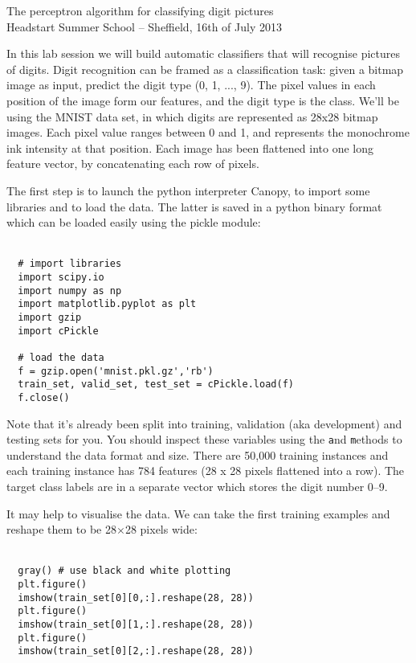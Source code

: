 \documentclass{article}
\newcommand{\mintinline}[1]{\colorbox{bg}{\lstinline[basicstyle=\ttfamily]{#1}}}
\begin{document}
\begin{center}
\textcolor{MyDarkBlue}{
{\LARGE The perceptron algorithm for classifying digit pictures\\}
\vspace*{.5cm}
{\large Headstart Summer School -- Sheffield, 16th of July 2013}
}
\end{center}
\vspace*{1cm}


In this lab session we will build automatic classifiers that will recognise pictures of digits. Digit recognition can be framed as a classification task: given a bitmap image as input, predict the digit type (0, 1, ..., 9). The pixel values in each position of the image form our features, and the digit type is the class. We'll be using the MNIST data set, in which digits are represented as 28x28 bitmap images. Each pixel value ranges between 0 and 1, and represents the monochrome ink intensity at that position. Each image has been flattened into one long feature vector, by concatenating each row of pixels. 

The first step is to launch the python interpreter Canopy, to import some libraries and to load the data. The latter is saved in a python binary format which can be loaded easily using the pickle module:\\ \ \\
\begin{verbatim}
  # import libraries
  import scipy.io
  import numpy as np
  import matplotlib.pyplot as plt
  import gzip 
  import cPickle 

  # load the data
  f = gzip.open('mnist.pkl.gz','rb') 
  train_set, valid_set, test_set = cPickle.load(f) 
  f.close()

\end{verbatim}

Note that it's already been split into training, validation (aka development) and testing sets for you. You should inspect these variables using the \texttt and \texttt methods to understand the data format and size. There are 50,000 training instances and each training instance has 784 features (28 x 28 pixels flattened into a row). The target class labels are in a separate vector which stores the digit number 0--9.

It may help to visualise the data. We can take the first training examples and reshape them to be 28$\times$28 pixels wide:\\ \ \\
\begin{verbatim}
  gray() # use black and white plotting
  plt.figure()
  imshow(train_set[0][0,:].reshape(28, 28))
  plt.figure()
  imshow(train_set[0][1,:].reshape(28, 28))
  plt.figure()
  imshow(train_set[0][2,:].reshape(28, 28))
\end{verbatim}
\end{document}
